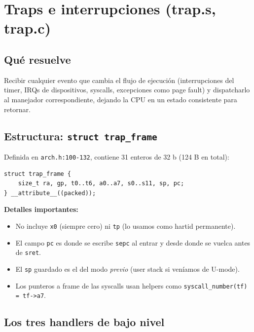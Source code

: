 \documentclass[11pt,a4paper]{article}
\begin{document}
\section{Traps e interrupciones (trap.s, trap.c)}

\subsection*{Qué resuelve}

Recibir cualquier evento que cambia el flujo de ejecución
(interrupciones del timer, IRQs de dispositivos, syscalls,
excepciones como page fault) y dispatcharlo al manejador
correspondiente, dejando la CPU en un estado consistente para
retornar.

\subsection*{Estructura: \texttt{struct trap\_frame}}

Definida en \texttt{arch.h:100-132}, contiene 31 enteros de 32 b
(124 B en total):

\begin{lstlisting}[style=cstyle]
struct trap_frame {
    size_t ra, gp, t0..t6, a0..a7, s0..s11, sp, pc;
} __attribute__((packed));
\end{lstlisting}

\textbf{Detalles importantes:}

\begin{itemize}[leftmargin=*,nosep]
    \item No incluye \texttt{x0} (siempre cero) ni \texttt{tp}
        (lo usamos como hartid permanente).
    \item El campo \texttt{pc} es donde se escribe \texttt{sepc}
        al entrar y desde donde se vuelca antes de \texttt{sret}.
    \item El \texttt{sp} guardado es el del modo \emph{previo}
        (user stack si veníamos de U-mode).
    \item Los punteros a frame de las syscalls usan helpers como
        \texttt{syscall\_number(tf) = tf->a7}.
\end{itemize}

\subsection*{Los tres handlers de bajo nivel}
\end{document}
